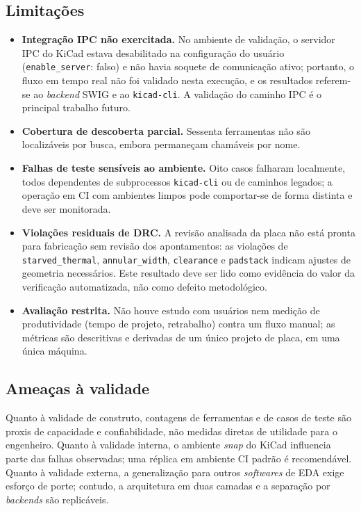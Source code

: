 \subsection{Limitações}

\begin{itemize}[leftmargin=1.4em,itemsep=0.25em]
  \item \textbf{Integração IPC não exercitada.} No ambiente de validação, o
        servidor IPC do KiCad estava desabilitado na configuração do usuário
        (\texttt{enable\_server}: falso) e não havia soquete de comunicação
        ativo; portanto, o fluxo em tempo real não foi validado nesta execução,
        e os resultados referem-se ao \emph{backend} SWIG e ao
        \texttt{kicad-cli}. A validação do caminho IPC é o principal trabalho
        futuro.
  \item \textbf{Cobertura de descoberta parcial.} Sessenta ferramentas não são
        localizáveis por busca, embora permaneçam chamáveis por nome.
  \item \textbf{Falhas de teste sensíveis ao ambiente.} Oito casos falharam
        localmente, todos dependentes de subprocessos \texttt{kicad-cli} ou de
        caminhos legados; a operação em CI com ambientes limpos pode
        comportar-se de forma distinta e deve ser monitorada.
  \item \textbf{Violações residuais de DRC.} A revisão analisada da placa não
        está pronta para fabricação sem revisão dos apontamentos: as violações
        de \texttt{starved\_thermal}, \texttt{annular\_width},
        \texttt{clearance} e \texttt{padstack} indicam ajustes de geometria
        necessários. Este resultado deve ser lido como evidência do valor da
        verificação automatizada, não como defeito metodológico.
  \item \textbf{Avaliação restrita.} Não houve estudo com usuários nem medição
        de produtividade (tempo de projeto, retrabalho) contra um fluxo
        manual; as métricas são descritivas e derivadas de um único projeto de
        placa, em uma única máquina.
\end{itemize}

\subsection{Ameaças à validade}

Quanto à validade de construto, contagens de ferramentas e de casos de teste
são proxis de capacidade e confiabilidade, não medidas diretas de utilidade
para o engenheiro. Quanto à validade interna, o ambiente \emph{snap} do KiCad
influencia parte das falhas observadas; uma réplica em ambiente CI padrão é
recomendável. Quanto à validade externa, a generalização para outros
\emph{softwares} de EDA exige esforço de porte; contudo, a arquitetura em duas
camadas e a separação por \emph{backends} são replicáveis.

